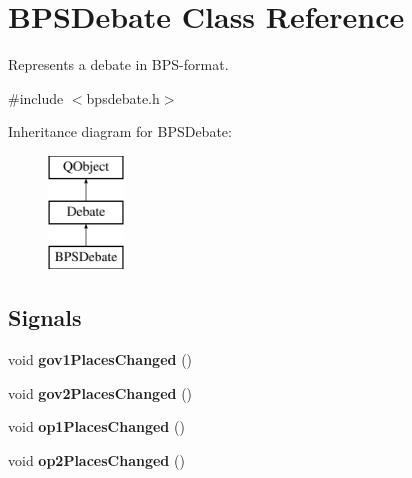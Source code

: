 \hypertarget{classBPSDebate}{\section{B\-P\-S\-Debate Class Reference}
\label{classBPSDebate}
}


Represents a debate in B\-P\-S-\/format.  




{\ttfamily \#include $<$bpsdebate.\-h$>$}

Inheritance diagram for B\-P\-S\-Debate\-:\begin{figure}[H]
\begin{center}
\leavevmode
\includegraphics[height=3.000000cm]{classBPSDebate}
\end{center}
\end{figure}
\subsection*{Signals}
\begin{DoxyCompactItemize}
\item 
\hypertarget{classBPSDebate_acb0f8aa5921167908fd2fff0d2ffc809}{void {\bfseries gov1\-Places\-Changed} ()}\label{classBPSDebate_acb0f8aa5921167908fd2fff0d2ffc809}

\item 
\hypertarget{classBPSDebate_a95d0b266c9494ec0bd16030d78a54ea8}{void {\bfseries gov2\-Places\-Changed} ()}\label{classBPSDebate_a95d0b266c9494ec0bd16030d78a54ea8}

\item 
\hypertarget{classBPSDebate_aa88ab8369b13eab679458bf0efe38554}{void {\bfseries op1\-Places\-Changed} ()}\label{classBPSDebate_aa88ab8369b13eab679458bf0efe38554}

\item 
\hypertarget{classBPSDebate_aa71781723f82369b75f3af18cf50c5ba}{void {\bfseries op2\-Places\-Changed} ()}\label{classBPSDebate_aa71781723f82369b75f3af18cf50c5ba}

\end{DoxyCompactItemize}
